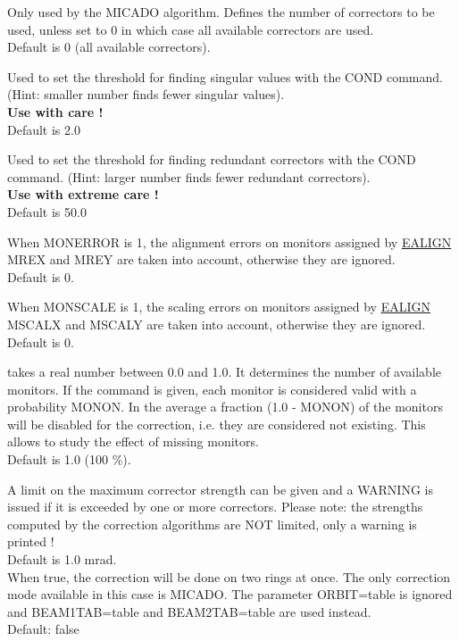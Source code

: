 \begin{madlist}
    Only used by the MICADO algorithm. Defines the number of
     correctors to be used, unless set to 0 in which case all available
     correctors are used.  
     \\ Default is 0 (all available correctors). 

     Used to set the threshold for finding singular values
     with the COND command. (Hint: smaller number finds fewer singular
     values).  
     \\ {\bf Use with care ! }
     \\ Default is 2.0 

     Used to set the threshold for finding redundant
     correctors with the COND command. (Hint: larger number finds fewer
     redundant correctors).  
     \\ {\bf Use with extreme care ! }
     \\ Default is 50.0 

    When MONERROR is 1, the alignment errors on monitors
     assigned  by \href{../error/error_align.html}{EALIGN} MREX and MREY
     are taken into account, otherwise they are ignored.  
     \\ Default is 0. 

    When MONSCALE is 1, the scaling errors on monitors
     assigned  by \href{../error/error_align.html}{EALIGN} MSCALX and
     MSCALY are taken into account, otherwise they are ignored.  
     \\ Default is 0. 

    takes a real number between 0.0 and 1.0. It
     determines the number of available monitors. If the command is
     given, each monitor is considered valid with a probability
     MONON. In the average a fraction (1.0 - MONON) of the monitors will
     be disabled for the correction, i.e. they are considered  not
     existing.  This allows to study the effect of missing monitors.  
     \\ Default is 1.0 (100 \%). 

     A limit on the maximum corrector strength can be
     given and a WARNING is issued if it is exceeded by one or more
     correctors.  Please note: the strengths computed by the correction
     algorithms are NOT limited, only a warning is printed ! 
     \\ Default is 1.0 mrad. \\

    When true, the correction will be done on two rings at
     once. The only correction mode available in this case is
     MICADO. The parameter ORBIT=table is ignored and BEAM1TAB=table and
     BEAM2TAB=table are used instead.  
     \\ Default: false \\


\end{madlist}
